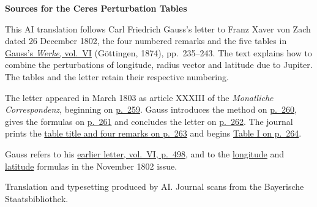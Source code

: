 \clearpage\thispagestyle{empty}
\begin{center}\textbf{Sources for the Ceres Perturbation Tables}\end{center}
\noindent This AI translation follows Carl Friedrich Gauss’s letter to Franz Xaver von Zach dated 26 December 1802, the four numbered remarks and the five tables in \href{https://gdz.sub.uni-goettingen.de/id/PPN236007467}{Gauss’s \textit{Werke}, vol.~VI} (Göttingen, 1874), pp.~235--243. The text explains how to combine the perturbations of longitude, radius vector and latitude due to Jupiter. The tables and the letter retain their respective numbering.
\par\smallskip\noindent The letter appeared in March 1803 as article XXXIII of the \textit{Monatliche Correspondenz}, beginning on \href{https://api.digitale-sammlungen.de/iiif/image/v2/bsb10538599_00275/full/1450,/0/default.jpg}{p.~259}. Gauss introduces the method on \href{https://api.digitale-sammlungen.de/iiif/image/v2/bsb10538599_00276/full/1450,/0/default.jpg}{p.~260}, gives the formulas on \href{https://api.digitale-sammlungen.de/iiif/image/v2/bsb10538599_00277/full/1450,/0/default.jpg}{p.~261} and concludes the letter on \href{https://api.digitale-sammlungen.de/iiif/image/v2/bsb10538599_00278/full/1450,/0/default.jpg}{p.~262}. The journal prints the \href{https://api.digitale-sammlungen.de/iiif/image/v2/bsb10538599_00279/full/1450,/0/default.jpg}{table title and four remarks on p.~263} and begins \href{https://api.digitale-sammlungen.de/iiif/image/v2/bsb10538599_00280/full/1450,/0/default.jpg}{Table I on p.~264}.
\par\smallskip\noindent Gauss refers to his \href{https://api.digitale-sammlungen.de/iiif/image/v2/bsb10538598_00512/full/1450,/0/default.jpg}{earlier letter, vol.~VI, p.~498}, and to the \href{https://api.digitale-sammlungen.de/iiif/image/v2/bsb10538598_00509/full/1450,/0/default.jpg}{longitude} and \href{https://api.digitale-sammlungen.de/iiif/image/v2/bsb10538598_00510/full/1450,/0/default.jpg}{latitude} formulas in the November 1802 issue.
\par\smallskip\noindent Translation and typesetting produced by AI. Journal scans from the Bayerische Staatsbibliothek.
\clearpage
